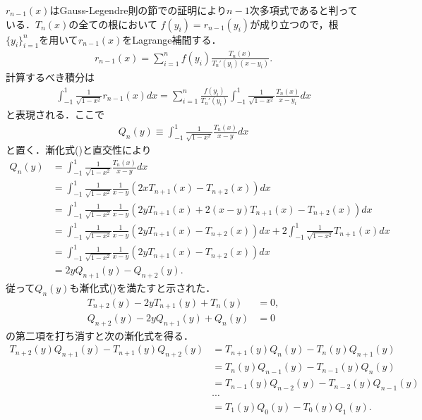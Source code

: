 \documentclass[a4j,papersize,disablejfam,slide,14pt]{jsarticle}
\begin{document}
    $r_{n-1}(x)$は{\rm Gauss-Legendre}則の節での証明により$n-1$次多項式であると判っている．$T_n(x)$の全ての根において
    $f(y_i) = r_{n-1}(y_i)$が成り立つので，根$\{y_i\}_{i=1}^{n}$を用いて$r_{n-1}(x)$を{\rm Lagrange}補間する．
    \begin{align}
    	r_{n-1}(x) = \sum_{i=1}^{n} f(y_i) \frac{T_n(x)}{T_n'(y_i)(x-y_i)}.
    \end{align}
    計算するべき積分は
    \begin{align}
    	\int_{-1}^{1} \frac{1}{\sqrt{1-x^2}} r_{n-1}(x) dx 
        = \sum_{i=1}^{n} \frac{f(y_i)}{T_n'(y_i)} \int_{-1}^{1} \frac{1}{\sqrt{1-x^2}} \frac{T_n(x)}{x-y_i} dx
    \end{align}
    と表現される．ここで
    \begin{align}
    	Q_n(y) \equiv \int_{-1}^{1} \frac{1}{\sqrt{1-x^2}} \frac{T_n(x)}{x-y} dx
    \end{align}
    と置く．漸化式()と直交性により
    \begin{align}
    	Q_n(y) &= \int_{-1}^{1} \frac{1}{\sqrt{1-x^2}} \frac{T_n(x)}{x-y} dx \\
        &= \int_{-1}^{1} \frac{1}{\sqrt{1-x^2}} \frac{1}{x-y} \left( 2xT_{n+1}(x) - T_{n+2}(x) \right) dx \\
        &= \int_{-1}^{1} \frac{1}{\sqrt{1-x^2}} \frac{1}{x-y} \left( 2yT_{n+1}(x) + 2(x-y)T_{n+1}(x) - T_{n+2}(x) \right) dx \\
        &= \int_{-1}^{1} \frac{1}{\sqrt{1-x^2}} \frac{1}{x-y} \left( 2yT_{n+1}(x) - T_{n+2}(x) \right) dx + 2 \int_{-1}^{1} \frac{1}{\sqrt{1-x^2}} T_{n+1}(x) dx \\
        &= \int_{-1}^{1} \frac{1}{\sqrt{1-x^2}} \frac{1}{x-y} \left( 2yT_{n+1}(x) - T_{n+2}(x) \right) dx \\
        &= 2yQ_{n+1}(y) - Q_{n+2}(y).
    \end{align}
    従って$Q_n(y)$も漸化式()を満たすと示された．
    \begin{align}
    	T_{n+2}(y) - 2yT_{n+1}(y) + T_n(y) &= 0, \\
        Q_{n+2}(y) - 2yQ_{n+1}(y) + Q_n(y) &= 0
    \end{align}
    の第二項を打ち消すと次の漸化式を得る．
    \begin{align}
    	T_{n+2}(y)Q_{n+1}(y) - T_{n+1}(y)Q_{n+2}(y) &= T_{n+1}(y)Q_n(y) - T_n(y)Q_{n+1}(y) \\
        &= T_n(y)Q_{n-1}(y) - T_{n-1}(y)Q_n(y) \\
        &= T_{n-1}(y)Q_{n-2}(y) - T_{n-2}(y)Q_{n-1}(y) \\
        &\cdots \\
        &= T_1(y)Q_0(y) - T_0(y)Q_1(y).
    \end{align}
\end{document}
